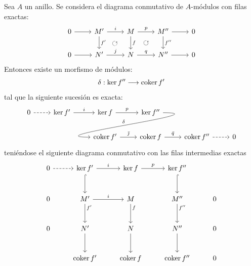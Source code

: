 \begin{lem}
    [de la Serpiente] 
Sea $A$ un anillo. Se considera el diagrama conmutativo de $A$-módulos con filas exactas:
$$
\begin{tikzcd}
	0 & {M'} & {M} & {M''} & 0 \\
	0 & {N'} & {N} & {N''} & 0
	\arrow["{f'}", from=1-2, to=2-2]
	\arrow["{f}", from=1-3, to=2-3]
	\arrow["{f''}", from=1-4, to=2-4]
	\arrow["{i}", from=1-2, to=1-3]
	\arrow["{p}", from=1-3, to=1-4]
	\arrow[         from=1-4, to=1-5]
	\arrow[         from=2-1, to=2-2]
	\arrow["{j}", from=2-2, to=2-3]
	\arrow["{q}", from=2-3, to=2-4]
	\arrow[         from=2-4, to=2-5]
	\arrow[         from=1-1, to=1-2]
	\arrow["\circlearrowleft"{marking}, draw=none, from=1-2, to=2-3]
	\arrow["\circlearrowleft"{marking}, draw=none, from=1-3, to=2-4]
\end{tikzcd}
$$
Entonces existe un morfismo de módulos:
$$\delta:\ker{f''}\longrightarrow\coker{f'}$$
tal que la siguiente sucesión es exacta:
\begin{equation*}
    \begin{tikzcd}
    	0 & {\ker{f'}} & {\ker{f}} & {\ker{f''}} \\
    	&& {\coker{f'}} & {\coker{f}} & {\coker{f''}} & 0
    	\arrow[          from=1-1, to=1-2, dashed]
    	\arrow["{i}", from=1-2, to=1-3]
    	\arrow["{p}", from=1-3, to=1-4]
    	\arrow[          from=2-5, to=2-6,dashed]
    	\arrow["{\bar \jmath}", from=2-3, to=2-4]
    	\arrow["{\bar q}", from=2-4, to=2-5]
    	\arrow["\delta", from=1-4, to=2-3, out=0, in=180, looseness=2, swap]
    \end{tikzcd}
\end{equation*}
teni\'endose el siguiente diagrama conmutativo con las filas intermedias exactas
$$ \begin{tikzcd}[row sep = large]
	0 & {\ker{f'}} & {\ker{f}} & {\ker{f''}} \\
	0 & {M'} & {M} & {M''} & 0 \\
	0 & {N'} & {N} & {N''} & 0 \\
	& {\coker{f'}} & {\coker{f}} & {\coker{f''}} & 0
	\arrow[hook,        from=1-2, to=2-2]
	\arrow["{f'}"{pos=0.2}, from=2-2, to=3-2]
	\arrow[   from=3-2, to=4-2]
	\arrow["{f}"{pos=0.2}, from=2-3, to=3-3, ""{coordinate, name=Z}]
	\arrow[   from=3-3, to=4-3]
	\arrow[hook,        from=1-4, to=2-4]
	\arrow["{f''}"{pos=0.2}, from=2-4, to=3-4]
	\arrow[   from=3-4, to=4-4]
	\arrow[from=1-1, to=1-2,dashed]
	\arrow["{i}",    from=1-2, to=1-3]
	\arrow["{p}",    from=1-3, to=1-4]
	\arrow["{i}",     from=2-2, to=2-3]

\end{tikzcd}$$
\end{lem}

